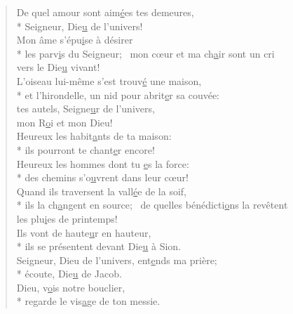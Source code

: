 
\begin{verse}
De quel amour sont aim\underline{é}es tes demeures, \\*
Seigneur, Die\underline{u} de l’univers! \\

Mon âme s’épu\underline{i}se à désirer \\*
les parv\underline{i}s du Seigneur;~\psalmstar
mon cœur et ma ch\underline{a}ir sont un cri \\
vers le Die\underline{u} vivant! \\

L’oiseau lui-même s’est trouv\underline{é} une maison, \\*
et l’hirondelle, un nid pour abrit\underline{e}r sa couvée: \\
tes autels, Seigne\underline{u}r de l’univers, \\
mon R\underline{o}i et mon Dieu! \\

Heureux les habit\underline{a}nts de ta maison: \\*
ils pourront te chant\underline{e}r encore! \\
Heureux les hommes dont tu \underline{e}s la force: \\*
des chemins s’o\underline{u}vrent dans leur cœur! \\

Quand ils traversent la vall\underline{é}e de la soif, \\*
ils la ch\underline{a}ngent en source;~\psalmstar
de quelles bénédicti\underline{o}ns la revêtent \\
les plu\underline{i}es de printemps! \\

Ils vont de haute\underline{u}r en hauteur, \\*
ils se présentent devant Die\underline{u} à Sion. \\

Seigneur, Dieu de l’univers, ent\underline{e}nds ma prière; \\*
écoute, Die\underline{u} de Jacob. \\
Dieu, v\underline{o}is notre bouclier, \\*
regarde le vis\underline{a}ge de ton messie. \\


\end{verse}
